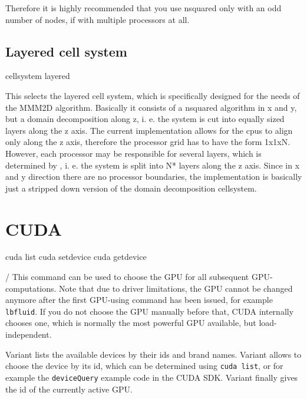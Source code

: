 Therefore it is highly recommended that you use nsquared only with an
odd number of nodes, if with multiple processors at all. 

\subsection{Layered cell system}

\begin{pysyntax}
\end{pysyntax}


\begin{essyntax}
  cellsystem layered 
\end{essyntax}

This selects the layered cell system, which is specifically designed
for the needs of the MMM2D algorithm. Basically it consists of a
nsquared algorithm in x and y, but a domain decomposition along z, i.
e. the system is cut into equally sized layers along the z axis. The
current implementation allows for the cpus to align only along the z
axis, therefore the processor grid has to have the form 1x1xN.
However, each processor may be responsible for several layers, which
is determined by , i. e. the system is split into
N* layers along the z axis. Since in x and y direction
there are no processor boundaries, the implementation is basically
just a stripped down version of the domain decomposition cellsystem.

\section{CUDA}
\label{sec:cuda}
\begin{essyntax}
   cuda list
   cuda setdevice 
   cuda getdevice
\end{essyntax}
/
This command can be used to choose the GPU for all subsequent
GPU-computations. Note that due to driver limitations, the GPU cannot
be changed anymore after the first GPU-using command has been issued,
for example \texttt{lbfluid}. If you do not choose the GPU manually
before that, CUDA internally chooses one, which is normally the most
powerful GPU available, but load-independent.

Variant  lists the available devices by their ids and brand
names. Variant  allows to choose the device by its id,
which can be determined using \texttt{cuda list}, or for example the
\texttt{deviceQuery} example code in the CUDA SDK. Variant 
finally gives the id of the currently active GPU.


